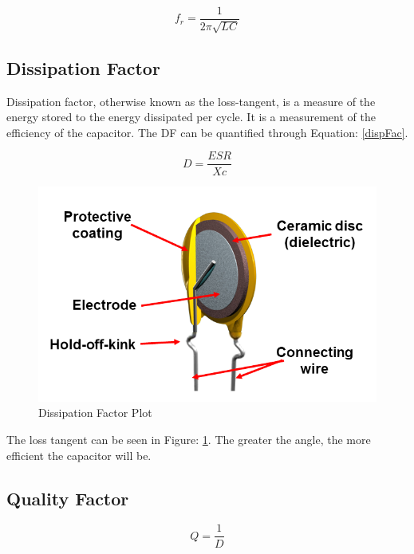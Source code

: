 \begin{equation}
\label{fres}
f_r = \frac{1}{2\pi \sqrt{LC}}
\end{equation}

\subsection{Dissipation Factor}

Dissipation factor, otherwise known as the loss-tangent, is a measure of the energy stored to the energy dissipated per cycle. It is a measurement of the efficiency of the capacitor. The DF can be quantified through Equation: \eqref{dispFac}. 

\begin{equation}
\label{dispFac}
D = \frac{ESR}{Xc}
\end{equation}

\begin{figure}
    \includegraphics[keepaspectratio=true,scale=.5]{./figures/testImage.png}
    \centering
    \caption{Dissipation Factor Plot}
    \label{dfPlot}
\end{figure}

The loss tangent can be seen in Figure: \ref{dfPlot}. The greater the angle, the more efficient the capacitor will be.

\subsection{Quality Factor}

\begin{equation}
\label{qual}
Q = \frac{1}{D}
\end{equation}

